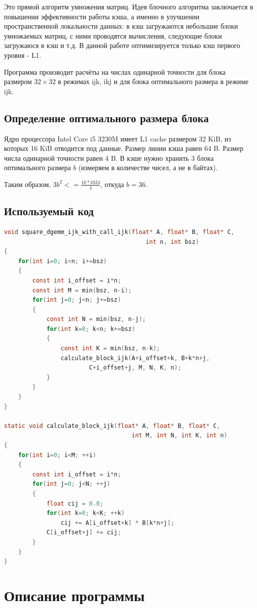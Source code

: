 \documentclass[14pt]{extarticle}
\begin{document}
Это прямой алгоритм умножения матриц. Идея блочного алгоритма заключается в повышении эффективности работы кэша, а именно в улучшении пространственной локальности данных: в кэш загружаются небольшие блоки умножаемых матриц, с ними проводятся вычисления, следующие блоки загружаюся в кэш и т.д.
В данной работе оптимизируется только кэш первого уровня - L1.

Программа производит расчёты на числах одинарной точности для блока размером $32 \times 32$ в режимах ijk, ikj и для блока оптимального размера в режиме ijk.

\subsection*{Определение оптимального размера блока}
Ядро процессора Intel Core i5 3230M имеет L1 cache размером 32 KiB, из которых 16 KiB отводится под данные.
Размер линии кэша равен 64 B.
Размер числа одинарной точности равен 4 B.
В кэше нужно хранить 3 блока оптимального размера $b$ (измеряем в количестве чисел, а не в байтах).

Таким образом, $ 3b^2 <= \frac{16*1024}{4} $, откуда $b = 36$.

\subsection*{Используемый код}
\begin{lstlisting}[language=C]
void square_dgemm_ijk_with_call_ijk(float* A, float* B, float* C,
                                        int n, int bsz)
{
    for(int i=0; i<n; i+=bsz)
    {
        const int i_offset = i*n;
        const int M = min(bsz, n-i);
        for(int j=0; j<n; j+=bsz)
        {
            const int N = min(bsz, n-j);
            for(int k=0; k<n; k+=bsz)
            {
                const int K = min(bsz, n-k);
                calculate_block_ijk(A+i_offset+k, B+k*n+j,
                		C+i_offset+j, M, N, K, n);
            }
        }
    }
}

static void calculate_block_ijk(float* A, float* B, float* C,
                                    int M, int N, int K, int n)
{
    for(int i=0; i<M; ++i)
    {
        const int i_offset = i*n;
        for(int j=0; j<N; ++j)
        {
            float cij = 0.0;
            for(int k=0; k<K; ++k)
                cij += A[i_offset+k] * B[k*n+j];
            C[i_offset+j] += cij;
        }
    }
}
\end{lstlisting}

\section*{Описание программы}
\end{document}
